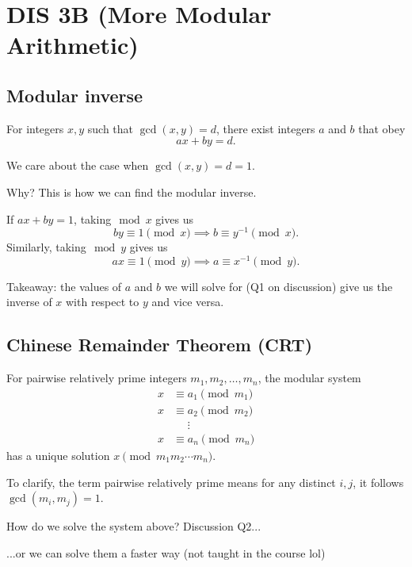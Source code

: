 \section{DIS 3B (More Modular Arithmetic)}

\subsection{Modular inverse}
\begin{lemma}[Bézout]
    For integers $x,y$ such that $\gcd(x,y) = d$, there exist integers $a$ and $b$ that obey \[ ax + by = d. \]
\end{lemma}

We care about the case when $\gcd(x,y) = d = 1$. 

Why? This is how we can find the modular inverse. 

\vspace{3mm}

If $ax + by = 1$, taking$\mod x$ gives us \[ by \equiv 1 \pmod{x} \implies b \equiv y^{-1} \pmod{x}. \] Similarly, taking$\mod y$ gives us \[ ax \equiv 1 \pmod{y} \implies a \equiv x^{-1} \pmod{y}. \]

Takeaway: the values of $a$ and $b$ we will solve for (Q1 on discussion) give us the inverse of $x$ with respect to $y$ and vice versa. 

\subsection{Chinese Remainder Theorem (CRT)}

\begin{theorem}[CRT]
    For pairwise relatively prime integers $m_1, m_2, \ldots, m_n$, the modular system \begin{align*}
        x &\equiv a_1 \pmod{m_1} \\
        x &\equiv a_2 \pmod{m_2} \\
        &\phantom{=}\vdots \\
        x &\equiv a_n \pmod{m_n} 
    \end{align*} has a unique solution $x \pmod{m_1m_2\cdots m_n}$. 

    To clarify, the term pairwise relatively prime means for any distinct $i,j$, it follows $\gcd(m_i, m_j) = 1$. 
\end{theorem}

How do we solve the system above? Discussion Q2...

...or we can solve them a faster way (not taught in the course lol)

